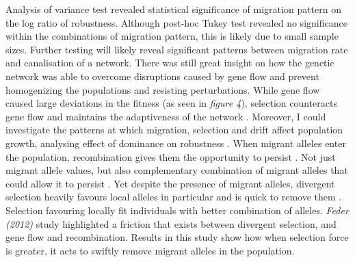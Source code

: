 Analysis of variance test revealed statistical significance of migration pattern on the log ratio of robustness. Although post-hoc Tukey test revealed no significance within the combinations of migration pattern, this is likely due to small sample sizes. Further testing will likely reveal significant patterns between migration rate and canalisation of a network. There was still great insight on how the genetic network was able to overcome disruptions caused by gene flow and prevent homogenizing the populations and resisting perturbations. While gene flow caused large deviations in the fitness (as seen in \textit{figure 4}), selection counteracts gene flow and maintains the adaptiveness of the network \cite{feder2012genomics,burt1995evolution}. Moreover, I could investigate the patterns at which migration, selection and drift affect population growth, analysing effect of dominance on robustness \cite{rice2009evolution,otto1999balanced}. When migrant alleles enter the population, recombination gives them the opportunity to persist \cite{feder2012genomics}. Not just migrant allele values, but also complementary combination of migrant alleles that could allow it to persist \cite{feder2012genomics}. Yet despite the presence of migrant alleles, divergent selection heavily favours local alleles in particular and is quick to remove them \cite{tigano2016genomics}. Selection favouring locally fit individuals with better combination of alleles. \textit{Feder (2012)} study highlighted a friction that exists between divergent selection, and gene flow and recombination. Results in this study show how when selection force is greater, it acts to swiftly remove migrant alleles in the population.\\
